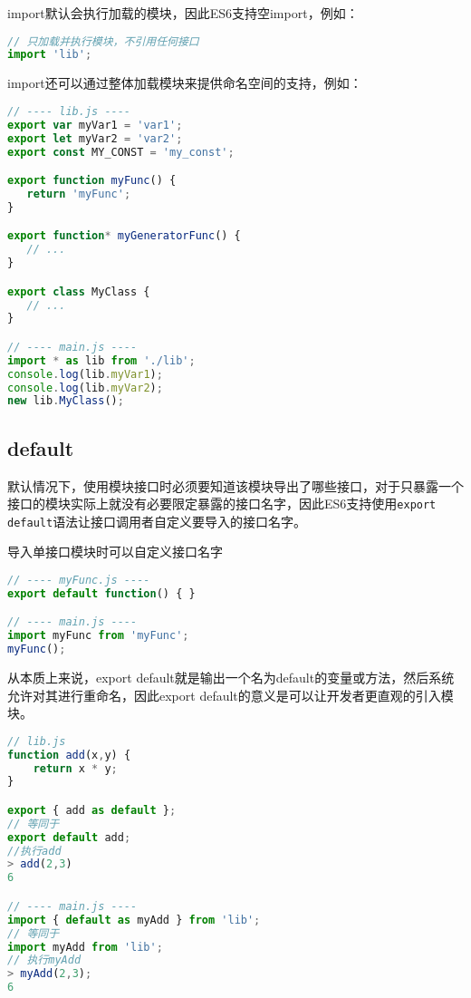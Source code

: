 import默认会执行加载的模块，因此ES6支持空import，例如：


\begin{lstlisting}[language=JavaScript]
// 只加载并执行模块，不引用任何接口
import 'lib';
\end{lstlisting}

import还可以通过整体加载模块来提供命名空间的支持，例如：



\begin{lstlisting}[language=JavaScript]
// ---- lib.js ----
export var myVar1 = 'var1';
export let myVar2 = 'var2';
export const MY_CONST = 'my_const';

export function myFunc() {
   return 'myFunc';
}

export function* myGeneratorFunc() {
   // ...
}

export class MyClass {
   // ...
}

// ---- main.js ----
import * as lib from './lib';
console.log(lib.myVar1);
console.log(lib.myVar2);
new lib.MyClass();
\end{lstlisting}




\subsection{default}

默认情况下，使用模块接口时必须要知道该模块导出了哪些接口，对于只暴露一个接口的模块实际上就没有必要限定暴露的接口名字，因此ES6支持使用\texttt{export default}语法让接口调用者自定义要导入的接口名字。



\begin{example}
导入单接口模块时可以自定义接口名字
\begin{lstlisting}[language=JavaScript]
// ---- myFunc.js ----
export default function() { }

// ---- main.js ----
import myFunc from 'myFunc';
myFunc();
\end{lstlisting}
\end{example}

从本质上来说，export default就是输出一个名为default的变量或方法，然后系统允许对其进行重命名，因此export default的意义是可以让开发者更直观的引入模块。




\begin{lstlisting}[language=JavaScript]
// lib.js
function add(x,y) {
    return x * y;
}

export { add as default };
// 等同于
export default add; 
//执行add
> add(2,3)
6

// ---- main.js ----
import { default as myAdd } from 'lib';
// 等同于
import myAdd from 'lib';
// 执行myAdd
> myAdd(2,3);
6
\end{lstlisting}




